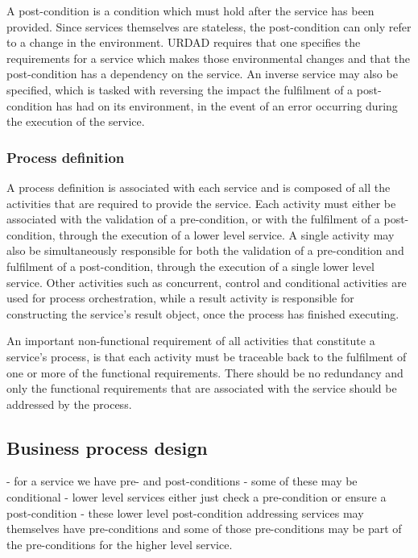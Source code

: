 A post-condition is a condition which must hold after the service has been provided. Since services themselves are stateless, the post-condition can only refer to a change in the environment. URDAD requires that one specifies the requirements for a service which makes those environmental changes and that the post-condition has a dependency on the service. An inverse service may also be specified, which is tasked with reversing the impact the fulfilment of a post-condition has had on its environment, in the event of an error occurring during the execution of the service.

\subsubsection{Process definition}

A process definition is associated with each service and is composed of all the activities that are required to provide the service. Each activity must either be associated with the validation of a pre-condition, or with the fulfilment of a post-condition, through the execution of a lower level service. A single activity may also be simultaneously responsible for both the validation of a pre-condition and fulfilment of a post-condition, through the execution of a single lower level service. Other activities such as concurrent, control and conditional activities are used for process orchestration, while a result activity is responsible for constructing the service's result object, once the process has finished executing. 

An important non-functional requirement of all activities that constitute a service's process, is that each activity must be traceable back to the fulfilment of one or more of the functional requirements. There should be no redundancy and only the functional requirements that are associated with the service should be addressed by the process.

\subsection{Business process design}
- for a service we have pre- and post-conditions - some of these may be conditional
- lower level services either just check a pre-condition or ensure a post-condition
- these lower level post-condition addressing services may themselves have pre-conditions and some of those pre-conditions may be part of the pre-conditions for the higher level service.

